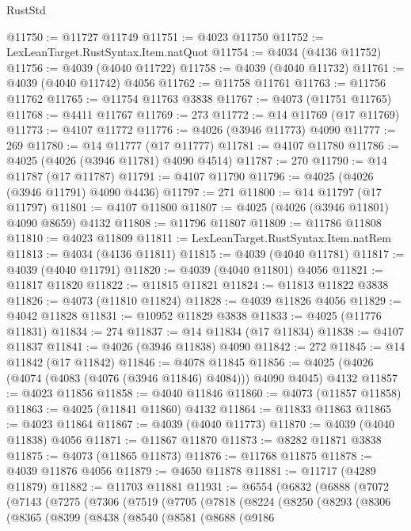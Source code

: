 \begin{lexlean}{RustStd}
\begin{coremodule}
@11750 := @11727 @11749
@11751 := @4023 @11750
@11752 := LexLeanTarget.RustSyntax.Item.natQuot
@11754 := @4034 (@4136 @11752)
@11756 := @4039 (@4040 @11722)
@11758 := @4039 (@4040 @11732)
@11761 := @4039 (@4040 @11742) @4056
@11762 := @11758 @11761
@11763 := @11756 @11762
@11765 := @11754 @11763 @3838
@11767 := @4073 (@11751 @11765)
@11768 := @4411 @11767
@11769 := 273
@11772 := @14 @11769 (@17 @11769)
@11773 := @4107 @11772
@11776 := @4026 (@3946 @11773) @4090
@11777 := 269
@11780 := @14 @11777 (@17 @11777)
@11781 := @4107 @11780
@11786 := @4025 (@4026 (@3946 @11781) @4090 @4514)
@11787 := 270
@11790 := @14 @11787 (@17 @11787)
@11791 := @4107 @11790
@11796 := @4025 (@4026 (@3946 @11791) @4090 @4436)
@11797 := 271
@11800 := @14 @11797 (@17 @11797)
@11801 := @4107 @11800
@11807 := @4025 (@4026 (@3946 @11801) @4090 @8659) @4132
@11808 := @11796 @11807
@11809 := @11786 @11808
@11810 := @4023 @11809
@11811 := LexLeanTarget.RustSyntax.Item.natRem
@11813 := @4034 (@4136 @11811)
@11815 := @4039 (@4040 @11781)
@11817 := @4039 (@4040 @11791)
@11820 := @4039 (@4040 @11801) @4056
@11821 := @11817 @11820
@11822 := @11815 @11821
@11824 := @11813 @11822 @3838
@11826 := @4073 (@11810 @11824)
@11828 := @4039 @11826 @4056
@11829 := @4042 @11828
@11831 := @10952 @11829 @3838
@11833 := @4025 (@11776 @11831)
@11834 := 274
@11837 := @14 @11834 (@17 @11834)
@11838 := @4107 @11837
@11841 := @4026 (@3946 @11838) @4090
@11842 := 272
@11845 := @14 @11842 (@17 @11842)
@11846 := @4078 @11845
@11856 := @4025 (@4026 (@4074 (@4083 (@4076 (@3946 @11846) @4084))) @4090 @4045) @4132
@11857 := @4023 @11856
@11858 := @4040 @11846
@11860 := @4073 (@11857 @11858)
@11863 := @4025 (@11841 @11860) @4132
@11864 := @11833 @11863
@11865 := @4023 @11864
@11867 := @4039 (@4040 @11773)
@11870 := @4039 (@4040 @11838) @4056
@11871 := @11867 @11870
@11873 := @8282 @11871 @3838
@11875 := @4073 (@11865 @11873)
@11876 := @11768 @11875
@11878 := @4039 @11876 @4056
@11879 := @4650 @11878
@11881 := @11717 (@4289 @11879)
@11882 := @11703 @11881
@11931 := @6554
    (@6832
      (@6888
        (@7072
          (@7143
            (@7275
              (@7306
                (@7519
                  (@7705
                    (@7818
                      (@8224
                        (@8250
                          (@8293
                            (@8306
                              (@8365
                                (@8399
                                  (@8438
                                    (@8540
                                      (@8581
                                        (@8688
                                          (@9186

\end{coremodule}
\end{lexlean}
